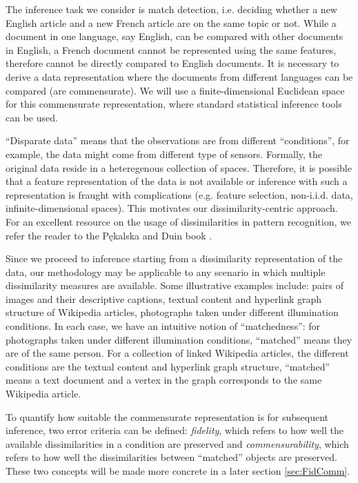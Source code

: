 \documentclass[12pt]{article} %
\begin{document}
  The inference task we consider is match detection, i.e. deciding whether a new English article and a new French article are on the same topic or not. While  a document in one language, say English, can be compared with other documents in English, a  French document  cannot be represented using the same features, therefore cannot be directly compared to English documents.  It is necessary   to derive a data representation  where the  documents from different languages can be compared (are commensurate).  %
	We will use a finite-dimensional Euclidean space for  this commensurate representation, where standard  statistical inference tools can be used.
	
     ``Disparate data''  means that  the observations are from  different ``conditions'', for example, the data might come from different type of sensors. Formally, the original data  reside in a heteregenous collection of  spaces.   
		Therefore, it is possible that a feature representation of the data is not available or inference with such a representation is fraught with complications (e.g. feature selection, non-i.i.d. data, infinite-dimensional spaces). This motivates our  dissimilarity-centric approach. For an excellent resource on the usage of dissimilarities in pattern recognition, we refer the reader to the P\k{e}kalska and Duin book \cite{duin2005dissimilarity}.
		
		Since we proceed to inference starting from a dissimilarity representation of the data, our methodology may be applicable to any scenario in which multiple dissimilarity measures are available.  Some illustrative examples include:  pairs of images and their descriptive captions,  textual content  and  hyperlink graph
structure of  Wikipedia  articles, photographs taken under different illumination conditions. In each case, we have an intuitive notion of ``matchedness'': for photographs taken under different illumination conditions, ``matched'' means they are of the same person. For a collection of linked Wikipedia articles, the different conditions  are  the textual content and hyperlink graph structure, ``matched'' means a text document and  a vertex  in the graph corresponds to the same Wikipedia article. 

    To quantify how suitable the commensurate representation is for subsequent inference, two error criteria can be defined: \emph{fidelity}, which refers to how well the available dissimilarities in a condition are preserved and \emph{commensurability}, which refers to how well the dissimilarities between ``matched'' objects are preserved. These two concepts will be made more concrete in a later section \ref{sec:FidComm}.
\end{document}
